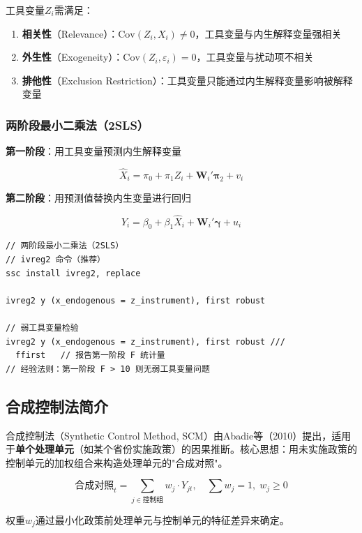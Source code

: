 工具变量$Z_i$需满足：

\begin{enumerate}[leftmargin=2em]
  \item \textbf{相关性}（Relevance）：$\text{Cov}(Z_i, X_i) \neq 0$，工具变量与内生解释变量强相关
  \item \textbf{外生性}（Exogeneity）：$\text{Cov}(Z_i, \varepsilon_i) = 0$，工具变量与扰动项不相关
  \item \textbf{排他性}（Exclusion Restriction）：工具变量只能通过内生解释变量影响被解释变量
\end{enumerate}

\subsubsection{两阶段最小二乘法（2SLS）}

\textbf{第一阶段}：用工具变量预测内生解释变量

\[
\hat{X}_i = \pi_0 + \pi_1 Z_i + \mathbf{W}_i'\boldsymbol{\pi}_2 + v_i
\]

\textbf{第二阶段}：用预测值替换内生变量进行回归

\[
Y_i = \beta_0 + \beta_1 \hat{X}_i + \mathbf{W}_i'\boldsymbol{\gamma} + u_i
\]

\begin{lstlisting}[style=stata]
// 两阶段最小二乘法（2SLS）
// ivreg2 命令（推荐）
ssc install ivreg2, replace

ivreg2 y (x_endogenous = z_instrument), first robust

// 弱工具变量检验
ivreg2 y (x_endogenous = z_instrument), first robust ///
  ffirst   // 报告第一阶段 F 统计量
// 经验法则：第一阶段 F > 10 则无弱工具变量问题
\end{lstlisting}

\subsection{合成控制法简介}

合成控制法（Synthetic Control Method, SCM）由Abadie等（2010）提出，适用于\textbf{单个处理单元}（如某个省份实施政策）的因果推断。核心思想：用未实施政策的控制单元的加权组合来构造处理单元的"合成对照"。

\[
\text{合成对照}_t = \sum_{j \in \text{控制组}} w_j \cdot Y_{jt}, \quad \sum w_j = 1, \; w_j \geq 0
\]

权重$w_j$通过最小化政策前处理单元与控制单元的特征差异来确定。

